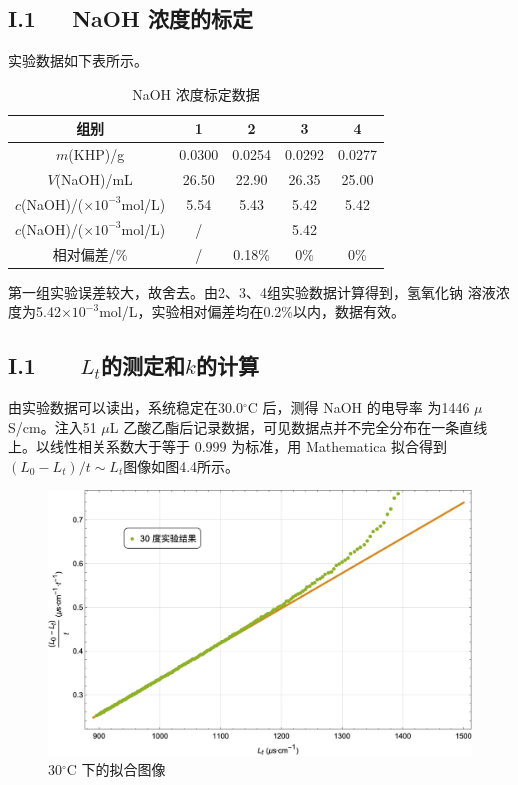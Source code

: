 \documentclass[12pt]{ctexart}
\numberwithin{equation}{section}
\begin{document}
\subsection*{I.1~~~NaOH 浓度的标定}

实验数据如下表所示。

\begin{longtable}{|c|c|c|c|c|}
    \caption{NaOH 浓度标定数据} \\
    \hline
    组别 & 1 & 2 & 3 & 4\\
    \hline
    $m$(KHP)/g & 0.0300 & 0.0254 & 0.0292 & 0.0277 \\
    \hline
    $V$(NaOH)/mL & 26.50 & 22.90 & 26.35 & 25.00 \\
    \hline
    $c$(NaOH)/($\times 10^{-3}$mol/L) & 5.54 & 5.43 & 5.42 & 5.42 \\
    \hline
    $c$(NaOH)/($\times 10^{-3}$mol/L) & / & \multicolumn{3}{c|}{5.42} \\
    \hline
    相对偏差/\% & / & 0.18\% & 0\% & 0\% \\
    \hline
\end{longtable}

第一组实验误差较大，故舍去。由2、3、4组实验数据计算得到，氢氧化钠
溶液浓度为5.42$\times 10^{-3}$mol/L，实验相对偏差均在0.2\%以内，数据有效。

\subsection*{I.1~~~ $L_t$的测定和$k$的计算}

由实验数据可以读出，系统稳定在30.0$^\circ$C 后，测得 NaOH 的电导率
为1446 $\mu$S/cm。注入51 $\mu$L 乙酸乙酯后记录数据，可见数据点并不完全分布在一条直线上。以线性相关系数大于等于 $0.999$ 为标准，用 Mathematica 拟合得到$(L_0 - L_t)/t \sim L_t$图像如图4.4所示。

\begin{figure}[!h]
    \centering
    \includegraphics[scale=0.45]{30degree.jpg}
    \caption{30$^\circ$C 下的拟合图像}
\end{figure}
\end{document}
